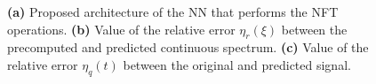 \begin{figure}[tb]
\begin{minipage}[h]{0.27\linewidth}
{    }
    \end{minipage}
    \hfill
    \begin{minipage}[h]{0.72\linewidth}
        \begin{minipage}[h]{1.0\linewidth}
        \end{minipage}
        \vfill
        \begin{minipage}[h]{1.0\linewidth}
        \end{minipage}
    \end{minipage}
    \caption{\textbf{(a)} Proposed architecture of the NN that performs the NFT operations. \textbf{(b)} Value of the relative error $\eta_r(\xi)$ between the precomputed and predicted continuous spectrum. \textbf{(c)} Value of the relative error $\eta_q(t)$ between the original and predicted signal.}
    \label{fig:arch_and_result_nn_nft}
\end{figure}

